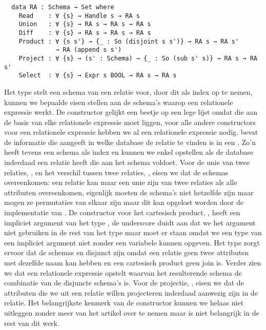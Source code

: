 \begin{verbatim}
  data RA : Schema → Set where
    Read    : ∀ {s} → Handle s → RA s
    Union   : ∀ {s} → RA s → RA s → RA s
    Diff    : ∀ {s} → RA s → RA s → RA s
    Product : ∀ {s s'} → {_ : So (disjoint s s')} → RA s → RA s'
              → RA (append s s')
    Project : ∀ {s} → (s' : Schema) → {_ : So (sub s' s)} → RA s → RA s'
    Select  : ∀ {s} → Expr s BOOL → RA s → RA s
\end{verbatim}

Het type  stelt een schema van een relatie voor, door dit als
index op te nemen, kunnen we bepaalde eisen stellen aan de schema's waarop een
relationele expressie werkt. De  constructor gelijkt een beetje op
een lege lijst omdat die aan de basis van elke relationele expressie moet
liggen, voor alle andere constructors voor een relationele expressie hebben we
al een relationele expressie nodig.  bevat de informatie die
aangeeft in welke database de relatie te vinden is in een . Zo'n
 heeft tevens een schema als index en kunnen we enkel opstellen
als de database inderdaad een relatie heeft die aan het schema voldoet. Voor de
unie van twee relaties, , en het verschil tussen twee relaties,
, eisen we dat de schemas overeenkomen: een relatie kan maar een
unie zijn van twee relaties als alle attributen overeenkomen, eigenlijk moeten
de schema's niet hetzelfde zijn maar mogen ze permutaties van elkaar zijn maar
dit kan opgelost worden door de implementatie van . De
constructor voor het cartesisch product, , heeft een impliciet
argument van het type , de underscore duidt aan dat
we het argument niet gebruiken in de rest van het type maar moet er staan omdat
we een type van een impliciet argument niet zonder een variabele kunnen
opgeven. Het type  zorgt ervoor dat de schemas
 en  disjunct zijn omdat een relatie geen twee attributen
met dezelfde naam kan hebben en een cartesisch product geen join is. Verder
zien we dat  een relationele expressie opstelt waarvan het
resulterende schema de combinatie van de disjuncte schema's is. Voor de
projectie, , eisen we dat de attributen die we uit een relatie
willen projecteren inderdaad aanwezig zijn in de relatie. Het belangrijkste
kenmerk van de  constructor kunnen we helaas niet uitleggen
zonder meer van het artikel over te nemen maar is niet belangrijk in de rest
van dit werk.

